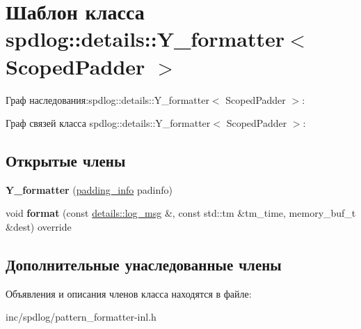 \hypertarget{classspdlog_1_1details_1_1Y__formatter}{}\section{Шаблон класса spdlog\+:\+:details\+:\+:Y\+\_\+formatter$<$ Scoped\+Padder $>$}
\label{classspdlog_1_1details_1_1Y__formatter}


Граф наследования\+:spdlog\+:\+:details\+:\+:Y\+\_\+formatter$<$ Scoped\+Padder $>$\+:


Граф связей класса spdlog\+:\+:details\+:\+:Y\+\_\+formatter$<$ Scoped\+Padder $>$\+:
\subsection*{Открытые члены}
\begin{DoxyCompactItemize}
\item 
\mbox{\label{classspdlog_1_1details_1_1Y__formatter_ad099d544ed342957b967b6f7cd8426b4}} 
{\bfseries Y\+\_\+formatter} (\hyperlink{structspdlog_1_1details_1_1padding__info}{padding\+\_\+info} padinfo)
\item 
\mbox{\label{classspdlog_1_1details_1_1Y__formatter_ac64b600ce6140ee81e118f81ada8ea23}} 
void {\bfseries format} (const \hyperlink{structspdlog_1_1details_1_1log__msg}{details\+::log\+\_\+msg} \&, const std\+::tm \&tm\+\_\+time, memory\+\_\+buf\+\_\+t \&dest) override
\end{DoxyCompactItemize}
\subsection*{Дополнительные унаследованные члены}


Объявления и описания членов класса находятся в файле\+:\begin{DoxyCompactItemize}
\item 
inc/spdlog/pattern\+\_\+formatter-\/inl.\+h\end{DoxyCompactItemize}
